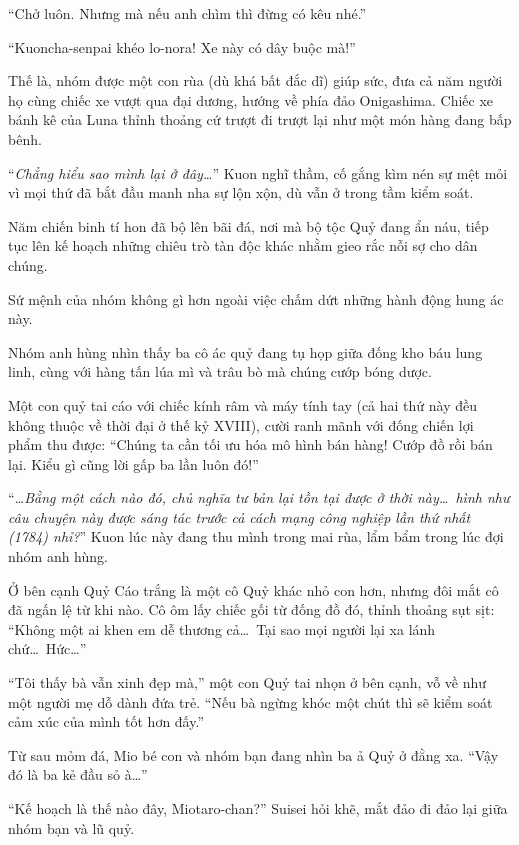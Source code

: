 \documentclass[../main.tex]{subfiles}
\begin{document}
``Chở luôn. Nhưng mà nếu anh chìm thì đừng có kêu nhé.''

``Kuoncha-senpai khéo lo-nora! Xe này có dây buộc mà!''

Thế là, nhóm được một con rùa (dù khá bất đắc dĩ) giúp sức, đưa cả năm người họ cùng chiếc xe vượt qua đại dương, hướng về phía đảo Onigashima. Chiếc xe bánh kê của Luna thỉnh thoảng cứ trượt đi trượt lại như một món hàng đang bấp bênh.

``\textit{Chẳng hiểu sao mình lại ở đây\dots}'' Kuon nghĩ thầm, cố gắng kìm nén sự mệt mỏi vì mọi thứ đã bắt đầu manh nha sự lộn xộn, dù vẫn ở trong tầm kiểm soát.

\ct

Năm chiến binh tí hon đã bộ lên bãi đá, nơi mà bộ tộc Quỷ đang ẩn náu, tiếp tục lên kế hoạch những chiêu trò tàn độc khác nhằm gieo rắc nỗi sợ cho dân chúng.

Sứ mệnh của nhóm không gì hơn ngoài việc chấm dứt những hành động hung ác này.

Nhóm anh hùng nhìn thấy ba cô ác quỷ đang tụ họp giữa đống kho báu lung linh, cùng với hàng tấn lúa mì và trâu bò mà chúng cướp bóng dược.

Một con quỷ tai cáo với chiếc kính râm và máy tính tay (cả hai thứ này đều không thuộc về thời đại ở thế kỷ XVIII), cười ranh mãnh với đống chiến lợi phẩm thu được: ``Chúng ta cần tối ưu hóa mô hình bán hàng! Cướp đồ rồi bán lại. Kiểu gì cũng lời gấp ba lần luôn đó!''

``\textit{\dots Bằng một cách nào đó, chủ nghĩa tư bản lại tồn tại được ở thời này\dots\ hình như câu chuyện này được sáng tác trước cả cách mạng công nghiệp lần thứ nhất (1784) nhỉ?}'' Kuon lúc này đang thu mình trong mai rùa, lẩm bẩm trong lúc đợi nhóm anh hùng.

Ở bên cạnh Quỷ Cáo trắng là một cô Quỷ khác nhỏ con hơn, nhưng đôi mắt cô đã ngấn lệ từ khi nào. Cô ôm lấy chiếc gối từ đống đồ đó, thỉnh thoảng sụt sịt: ``Không một ai khen em dễ thương cả\dots\ Tại sao mọi người lại xa lánh chứ\dots\ Hức\dots''

``Tôi thấy bà vẫn xinh đẹp mà,'' một con Quỷ tai nhọn ở bên cạnh, vỗ về như một người mẹ dỗ dành đứa trẻ. ``Nếu bà ngừng khóc một chút thì sẽ kiểm soát cảm xúc của mình tốt hơn đấy.''

Từ sau mỏm đá, Mio bé con và nhóm bạn đang nhìn ba ả Quỷ ở đằng xa. ``Vậy đó là ba kẻ đầu sỏ à\dots''

``Kế hoạch là thế nào đây, Miotaro-chan?'' Suisei hỏi khẽ, mắt đảo đi đảo lại giữa nhóm bạn và lũ quỷ.
\end{document}
